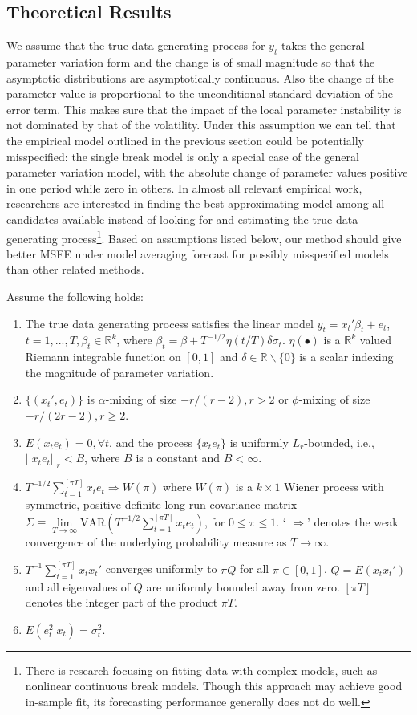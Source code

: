 \subsection{Theoretical Results}
We assume that the true data generating process for $y_t$ takes the general parameter variation form and the change is of small magnitude so that the asymptotic distributions are asymptotically continuous. Also the change of the parameter value is proportional to the unconditional standard deviation of the error term. This makes sure that the impact of the local parameter instability is not dominated by that of the volatility. Under this assumption we can tell that the empirical model outlined in the previous section could be potentially misspecified: the single break model is only a special case of the general parameter variation model, with the absolute change of parameter values positive in one period while zero in others. In almost all relevant empirical work, researchers are interested in finding the best approximating model among all candidates available instead of looking for and estimating the true data generating process\footnote{There is research focusing on fitting data with complex models, such as nonlinear continuous break models. Though this approach may achieve good in-sample fit, its forecasting performance generally does not do well.}. Based on assumptions listed below, our method should give better MSFE under model averaging forecast for possibly misspecified models than other related methods.
\begin{assumption}\label{asump:1}
Assume the following holds:
\begin{enumerate}
	\item The true data generating process satisfies the linear model $y_t = x_t'\beta_t + e_t$, $t=1,...,T,\beta_t \in \mathbb{R}^k$, where $\beta_t = \beta + T^{-1/2}\eta(t/T)\delta\sigma_t$. $\eta(\bullet)$ is a $\mathbb{R}^k$ valued Riemann integrable function on $[0,1]$ and $\delta \in \mathbb{R}\backslash\{0\}$ is a scalar indexing the magnitude of parameter variation.
	\item $\{(x_t',e_t)\}$ is $\alpha$-mixing of size $-r/(r-2),r > 2$ or $\phi$-mixing of size $-r/(2r-2),r \geq 2$.
    \item $E(x_t e_t) = 0, \forall t$, and the process $\{x_t e_t\}$ is uniformly $L_r$-bounded, i.e., $||x_t e_t||_{r} < B$, where $B$ is a constant and $B < \infty$.
    \item $T^{-1/2}\sum_{t=1}^{[\pi T]} x_t e_t \Rightarrow W(\pi)$ where $W(\pi)$ is a $k \times 1$ Wiener process with symmetric, positive definite long-run covariance matrix $\Sigma \equiv \lim\limits_{T\to \infty}\mathrm{VAR}(T^{-1/2}\sum_{t=1}^{[\pi T]} x_t e_t)$, for $0 \leq \pi \leq 1$. ` $\Rightarrow$' denotes the weak convergence of the underlying probability measure as $T \to \infty$.
	\item $T^{-1}\sum_{t=1}^{[\pi T]}x_t x_t'$ converges uniformly to $\pi Q$ for all $\pi \in [0,1]$, $Q = E(x_t x_t')$ and all eigenvalues of $Q$ are uniformly bounded away from zero. $[\pi T]$ denotes the integer part of the product $\pi T$.
	\item $E(e_t^{2}|x_t) = \sigma_t^{2}$.
\end{enumerate}
\end{assumption}
